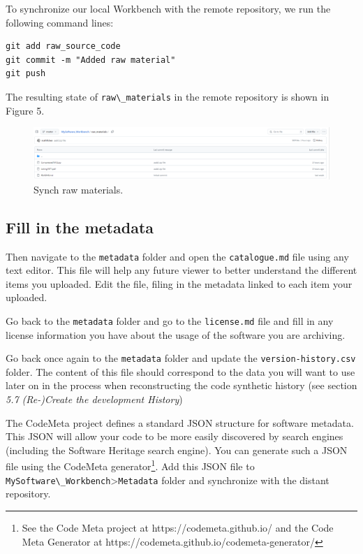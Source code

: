\documentclass[]{article}
\newcommand{\passthrough}[1]{#1}
\begin{document}
To synchronize our local Workbench with the remote repository, we run
the following command lines:

\begin{lstlisting}
git add raw_source_code
git commit -m "Added raw material"
git push
\end{lstlisting}

The resulting state of \passthrough{\lstinline!raw\_materials!} in the
remote repository is shown in Figure 5.

\begin{figure}
\hypertarget{fig:RawMaterials_local}{%
\centering
\includegraphics{./media2/13_AddRawMaterials.png}
\caption{Synch raw materials.}\label{fig:RawMaterials_local}
}
\end{figure}

\hypertarget{fill-in-the-metadata}{%
\subsection{Fill in the metadata}\label{fill-in-the-metadata}}

Then navigate to the \passthrough{\lstinline!metadata!} folder and open
the \passthrough{\lstinline!catalogue.md!} file using any text editor.
This file will help any future viewer to better understand the different
items you uploaded. Edit the file, filing in the metadata linked to each
item your uploaded.

Go back to the \passthrough{\lstinline!metadata!} folder and go to the
\passthrough{\lstinline!license.md!} file and fill in any license
information you have about the usage of the software you are archiving.

Go back once again to the \passthrough{\lstinline!metadata!} folder and
update the \passthrough{\lstinline!version-history.csv!} folder. The
content of this file should correspond to the data you will want to use
later on in the process when reconstructing the code synthetic history
(see section \emph{5.7 (Re-)Create the development History})

The CodeMeta project defines a standard JSON structure for software
metadata. This JSON will allow your code to be more easily discovered by
search engines (including the Software Heritage search engine). You can
generate such a JSON file using the CodeMeta generator\footnote{See the
  Code Meta project at https://codemeta.github.io/ and the Code Meta
  Generator at https://codemeta.github.io/codemeta-generator/}. Add this
JSON file to
\passthrough{\lstinline!MySoftware\_Workbench!}\textgreater{}\passthrough{\lstinline!Metadata!}
folder and synchronize with the distant repository.
\end{document}
